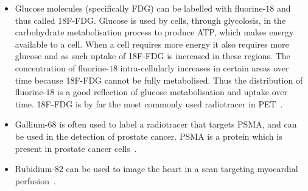                 \begin{itemize}
                    \item Glucose molecules (specifically \gls{FDG}) can be labelled with fluorine-$18$ and thus called \gls{18F-FDG}. %
                    Glucose is used by cells, through glycolosis, in the carbohydrate metabolisation process to produce \gls{ATP}, which makes energy available to a cell. When a cell requires more energy it also requires more glucose and as such uptake of \gls{18F-FDG} is increased in these regions. The concentration of fluorine-$18$ intra-cellularly increases in certain areas over time because \gls{18F-FDG} cannot be fully metabolised. Thus the distribution of fluorine-$18$ is a good reflection of glucose metabolisation and uptake over time. \gls{18F-FDG} is by far the most commonly used radiotracer in \gls{PET}~\parencite{WeissBook, FDGGuidelines}.
                    
                    \item Gallium-$68$ is often used to label a radiotracer that targets \gls{PSMA}, and can be used in the detection of prostate cancer. \gls{PSMA} is a protein which is present in prostate cancer cells~\parencite{Afshar-Oromieh2013PetLesions}.
                    
                    \item Rubidium-$82$ can be used to image the heart in a scan targeting myocardial perfusion~\parencite{Selwyn1982}.
                \end{itemize}
            
